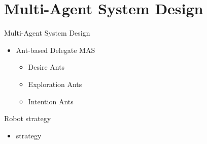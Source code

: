\section{Multi-Agent System Design}

\begin{frame}{Multi-Agent System Design}
    \begin{itemize}
        \item Ant-based Delegate MAS
            \begin{itemize}
                \item Desire Ants
                \item Exploration Ants
                \item Intention Ants
            \end{itemize}
    \end{itemize}
\end{frame}

\begin{frame}{Robot strategy}
    \begin{itemize}
        \item strategy
    \end{itemize}
\end{frame}

